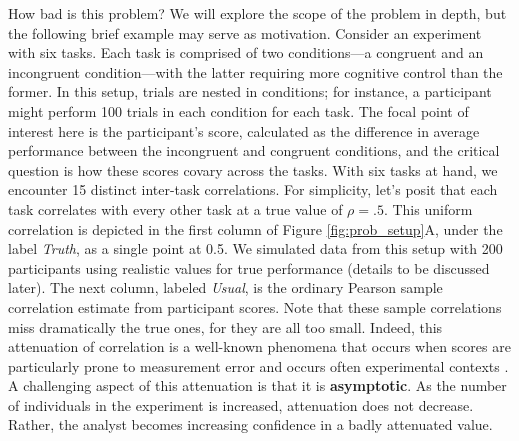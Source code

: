 \documentclass[man, 12pt]{apa7} %
\begin{document}
How bad is this problem?  We will explore the scope of the problem in depth, but the following brief example may serve as motivation.  Consider an experiment with six tasks.  Each task is comprised of two conditions---a congruent and an incongruent condition---with the latter requiring more cognitive control than the former.  In this setup, trials are nested in conditions; for instance, a participant might perform 100 trials in each condition for each task. The focal point of interest here is the participant's score, calculated as the difference in average performance between the incongruent and congruent conditions, and the critical question is how these scores covary across the tasks. With six tasks at hand, we encounter 15 distinct inter-task correlations. For simplicity, let's posit that each task correlates with every other task at a true value of $\rho=.5$. This uniform correlation is depicted in the first column of Figure \ref{fig:prob_setup}A, under the label \textit{Truth}, as a single point at 0.5. We simulated data from this setup with 200 participants using realistic values for true performance (details to be discussed later). The next column, labeled \textit{Usual}, is the ordinary Pearson sample correlation estimate from participant scores.  Note that these sample correlations miss dramatically the true ones, for they are all too small.  Indeed, this attenuation of correlation is a well-known phenomena that occurs when scores are particularly prone to measurement error \parencite{Spearman.1987} and occurs often experimental contexts \parencite{Hedge.etal.2018,Enkavi.etal.2019,Rouder.Haaf.2019}.  A challenging aspect of this attenuation is that it is \textbf{asymptotic}.  As the number of individuals in the experiment is increased, attenuation does not decrease.  Rather, the analyst becomes increasing confidence in a badly attenuated value.
\end{document}
